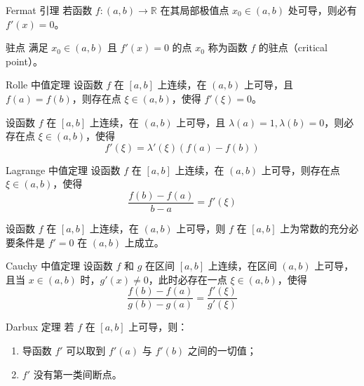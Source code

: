 \begin{theorem}{Fermat 引理}
  若函数 $f:(a,b)\to \mathbb{R}$ 在其局部极值点 $x_0 \in (a,b)$ 处可导，则必有 $f'(x) = 0$。
\end{theorem}

\begin{definition}{驻点}
  满足 $x_0 \in (a,b)$ 且 $f'(x) = 0$ 的点 $x_0$ 称为函数 $f$ 的驻点（critical point）。
\end{definition}

\begin{theorem}{Rolle 中值定理}
  设函数 $f$ 在 $[a,b]$ 上连续，在 $(a,b)$ 上可导，且 $f(a) = f(b)$，则存在点 $\xi \in (a,b)$，使得 $f'(\xi) = 0$。
\end{theorem}

\begin{lemma}
  设函数 $f$ 在 $[a,b]$ 上连续，在 $(a,b)$ 上可导，且 $\lambda(a) = 1, \lambda(b) = 0$，则必存在点 $\xi \in (a,b)$，使得
  \[f'(\xi) = \lambda'(\xi)(f(a) - f(b))\]
\end{lemma}

\begin{theorem}{Lagrange 中值定理}
  设函数 $f$ 在 $[a,b]$ 上连续，在 $(a,b)$ 上可导，则存在点 $\xi \in (a,b)$，使得
  \[\frac{f(b) - f(a)}{b - a} = f'(\xi)\]
\end{theorem}

\begin{corollary}
  设函数 $f$ 在 $[a,b]$ 上连续，在 $(a,b)$ 上可导，则 $f$ 在 $[a,b]$ 上为常数的充分必要条件是 $f' = 0$ 在 $(a,b)$ 上成立。
\end{corollary}

\begin{theorem}{Cauchy 中值定理}
  设函数 $f$ 和 $g$ 在区间 $[a,b]$ 上连续，在区间 $(a,b)$ 上可导，且当 $x \in (a,b)$ 时，$g'(x) \ne 0$，此时必存在一点 $\xi \in (a,b)$，使得
  \[\frac{f(b) - f(a)}{g(b) - g(a)} = \frac{f'(\xi)}{g'(\xi)}\]
\end{theorem}

\begin{theorem}{Darbux 定理}
  若 $f$ 在 $[a,b]$ 上可导，则：
  \begin{enumerate}
    \item 导函数 $f'$ 可以取到 $f'(a)$ 与 $f'(b)$ 之间的一切值；
    \item $f'$ 没有第一类间断点。
  \end{enumerate}
\end{theorem}





